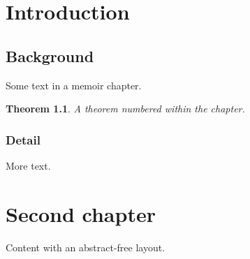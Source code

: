 \documentclass[11pt,oneside]{memoir}
\newtheorem{thm}{Theorem}[chapter]
\begin{document}
\tableofcontents*
\chapter{Introduction}
\section{Background}
Some text in a memoir chapter.
\begin{thm}
  A theorem numbered within the chapter.
\end{thm}
\subsection{Detail}
More text.
\chapter{Second chapter}
Content with an abstract-free layout.
\end{document}
